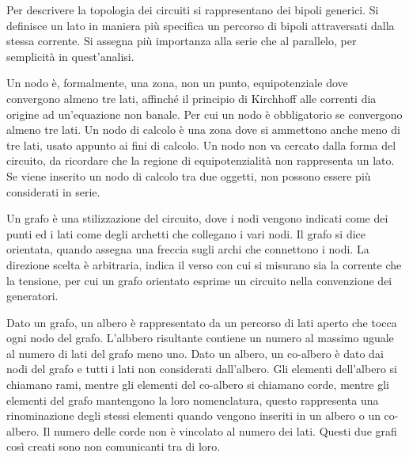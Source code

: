 \documentclass{article}
\numberwithin{equation}{subsection}
\begin{document}
Per descrivere la topologia dei circuiti si rappresentano dei bipoli generici. Si definisce un lato in maniera più specifica un percorso di bipoli attraversati dalla 
stessa corrente. Si assegna più importanza alla serie che al parallelo, per semplicità in quest'analisi. 

Un nodo è, formalmente, una zona, non un punto, equipotenziale dove convergono almeno tre lati, affinché il principio di Kirchhoff alle correnti dia origine ad un'equazione 
non banale. Per cui un nodo è obbligatorio se convergono almeno tre lati. Un nodo di calcolo è una zona dove si ammettono anche meno di tre lati, usato appunto ai fini di 
calcolo. Un nodo non va cercato dalla forma del circuito, da ricordare che la regione di equipotenzialità non rappresenta un lato. Se viene inserito un nodo di calcolo tra due 
oggetti, non possono essere più considerati in serie. 



Un grafo è una stilizzazione del circuito, dove i nodi vengono indicati come dei punti ed i lati come degli archetti che collegano i vari nodi. Il grafo si dice orientata, 
quando assegna una freccia sugli archi che connettono i nodi. La direzione scelta è arbitraria, indica il verso con cui si misurano sia la corrente che la tensione, per cui 
un grafo orientato esprime un circuito nella convenzione dei generatori.  



Dato un grafo, un albero è rappresentato da un percorso di lati aperto che tocca ogni nodo del grafo. L'albbero risultante contiene un numero al massimo uguale al numero di lati 
del grafo meno uno. Dato un albero, un co-albero è dato dai nodi del grafo e tutti i lati non considerati dall'albero. Gli elementi dell'albero si chiamano rami, mentre gli 
elementi del co-albero si chiamano corde, mentre gli elementi del grafo mantengono la loro nomenclatura, questo rappresenta una rinominazione degli stessi elementi quando 
vengono inseriti in un albero o un co-albero. Il numero delle corde non è vincolato al numero dei lati. Questi due grafi così creati sono non comunicanti tra di loro. 
\end{document}
